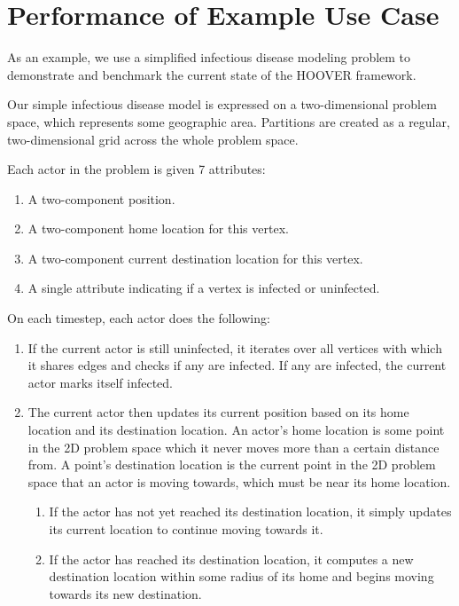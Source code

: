 \section{Performance of Example Use Case}

As an example, we use a simplified infectious disease modeling problem to
demonstrate and benchmark the current state of the HOOVER framework.

Our simple infectious disease model is expressed on a two-dimensional problem
space, which represents some geographic area. Partitions are created as a
regular, two-dimensional grid across the whole problem space.

Each actor in the problem is given 7 attributes:

\begin{enumerate}
    \item A two-component position.
    \item A two-component home location for this vertex.
    \item A two-component current destination location for this vertex.
    \item A single attribute indicating if a vertex is infected or uninfected.
\end{enumerate}

On each timestep, each actor does the following:

\begin{enumerate}
    \item If the current actor is still uninfected, it iterates over all
        vertices with which it shares edges and checks if any are infected. If
        any are infected, the current actor marks itself infected.
    \item The current actor then updates its current position based on its home
        location and its destination location. An actor's home location is some
        point in the 2D problem space which it never moves more than a certain
        distance from. A point's destination location is the current point in
        the 2D problem space that an actor is moving towards, which must be near
        its home location.
        \begin{enumerate}
            \item If the actor has not yet reached its destination location, it
                simply updates its current location to continue moving towards
                it.
            \item If the actor has reached its destination location, it
                computes a new destination location within some radius of its
                home and begins moving towards its new destination.
        \end{enumerate}
\end{enumerate}

